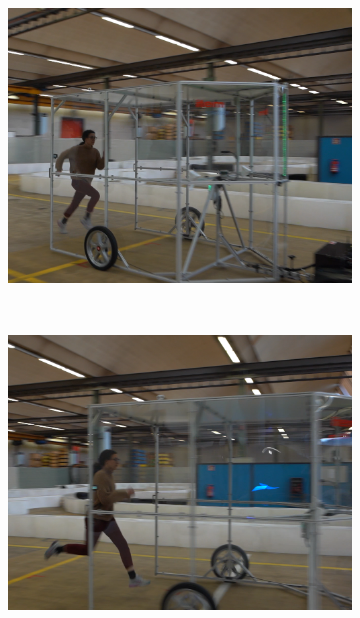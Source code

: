 \documentclass[a4paper,12pt,oneside]{book}
\begin{document}
\begin{figure}[h!]
\begin{subfigure}[b]{0.32\textwidth}
        \includegraphics[width=\textwidth]{SteadyState/ss3.png}
    \end{subfigure}
    \\[0.2cm]
    \begin{subfigure}[b]{0.32\textwidth}
        \includegraphics[width=\textwidth]{SteadyState/ss4.png}
    \end{subfigure}
    \hfill
    \begin{subfigure}[b]{0.32\textwidth}

\end{subfigure}
\end{figure}
\end{document}

